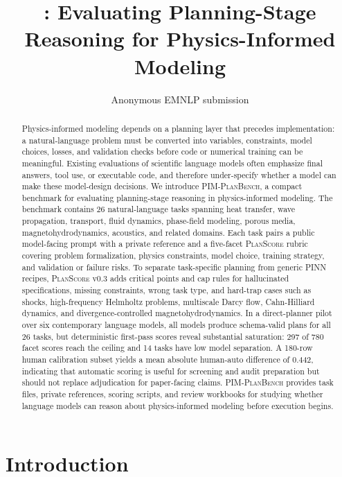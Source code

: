 \documentclass[11pt]{article}
\title{\pimplanbench{}: Evaluating Planning-Stage Reasoning for Physics-Informed Modeling}
\author{Anonymous EMNLP submission}
\newcommand{\pimplanbench}{\textsc{PIM-PlanBench}}
\newcommand{\planscore}{\textsc{PlanScore}}
\begin{document}
\maketitle

\begin{abstract}
Physics-informed modeling depends on a planning layer that precedes implementation: a natural-language problem must be converted into variables, constraints, model choices, losses, and validation checks before code or numerical training can be meaningful. Existing evaluations of scientific language models often emphasize final answers, tool use, or executable code, and therefore under-specify whether a model can make these model-design decisions. We introduce \pimplanbench{}, a compact benchmark for evaluating planning-stage reasoning in physics-informed modeling. The benchmark contains 26 natural-language tasks spanning heat transfer, wave propagation, transport, fluid dynamics, phase-field modeling, porous media, magnetohydrodynamics, acoustics, and related domains. Each task pairs a public model-facing prompt with a private reference and a five-facet \planscore{} rubric covering problem formalization, physics constraints, model choice, training strategy, and validation or failure risks. To separate task-specific planning from generic PINN recipes, \planscore{} v0.3 adds critical points and cap rules for hallucinated specifications, missing constraints, wrong task type, and hard-trap cases such as shocks, high-frequency Helmholtz problems, multiscale Darcy flow, Cahn-Hilliard dynamics, and divergence-controlled magnetohydrodynamics. In a direct-planner pilot over six contemporary language models, all models produce schema-valid plans for all 26 tasks, but deterministic first-pass scores reveal substantial saturation: 297 of 780 facet scores reach the ceiling and 14 tasks have low model separation. A 180-row human calibration subset yields a mean absolute human-auto difference of 0.442, indicating that automatic scoring is useful for screening and audit preparation but should not replace adjudication for paper-facing claims. \pimplanbench{} provides task files, private references, scoring scripts, and review workbooks for studying whether language models can reason about physics-informed modeling before execution begins.
\end{abstract}

\section{Introduction}
\end{document}
